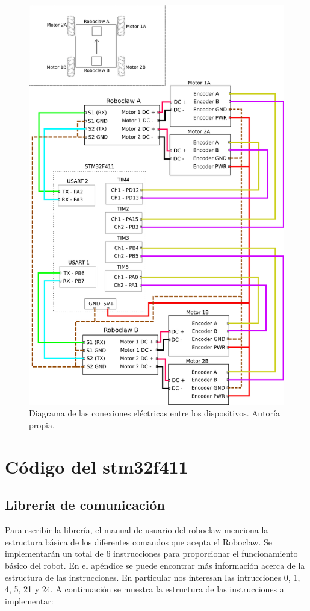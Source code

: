 \begin{figure}[h!]
\centering
\includegraphics[scale=0.63]{imagenes/diagrama_electrico.png}
\caption{Diagrama de las conexiones eléctricas entre los dispositivos. Autoría propia.}
\label{F:conexiones}
\end{figure}

\section{Código del stm32f411}

\subsection{Librería de comunicación}
Para escribir la librería, el manual de usuario del roboclaw menciona la estructura básica de los diferentes comandos que acepta el Roboclaw. Se implementarán un total de 6 instrucciones para proporcionar el funcionamiento básico del robot. En el apéndice se puede encontrar más información acerca de la estructura de las instrucciones. En particular nos interesan las intrucciones 0, 1, 4, 5, 21 y 24. A continuación se muestra la estructura de las instrucciones a implementar:

